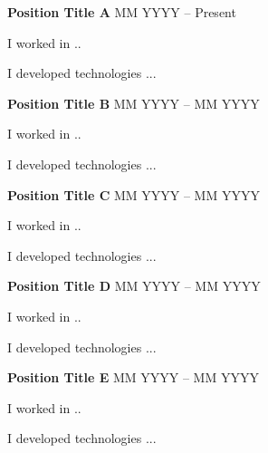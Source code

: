 {\textbf{Position Title A} \hfill MM YYYY -- Present}

\begin{zitemize}
\item I worked in ..
\item I developed technologies ...
\end{zitemize}

{\textbf{Position Title B} \hfill MM YYYY -- MM YYYY}

\begin{zitemize}
\item I worked in ..
\item I developed technologies ...
\end{zitemize}

{\textbf{Position Title C} \hfill MM YYYY -- MM YYYY}

\begin{zitemize}
\item I worked in ..
\item I developed technologies ...
\end{zitemize}

{\textbf{Position Title D} \hfill MM YYYY -- MM YYYY}

\begin{zitemize}
\item I worked in ..
\item I developed technologies ...
\end{zitemize}

{\textbf{Position Title E} \hfill MM YYYY -- MM YYYY}

\begin{zitemize}
\item I worked in ..
\item I developed technologies ...
\end{zitemize}